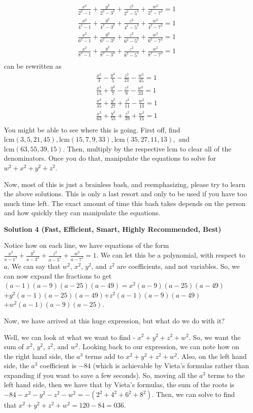 \begin{enumerate}
 
 \begin{align*} \frac{x^2}{2^2-1}+\frac{y^2}{2^2-3^2}+\frac{z^2}{2^2-5^2}+\frac{w^2}{2^2-7^2}=1\\ \frac{x^2}{4^2-1}+\frac{y^2}{4^2-3^2}+\frac{z^2}{4^2-5^2}+\frac{w^2}{4^2-7^2}=1\\ \frac{x^2}{6^2-1}+\frac{y^2}{6^2-3^2}+\frac{z^2}{6^2-5^2}+\frac{w^2}{6^2-7^2}=1\\ \frac{x^2}{8^2-1}+\frac{y^2}{8^2-3^2}+\frac{z^2}{8^2-5^2}+\frac{w^2}{8^2-7^2}=1\\ \end{align*}
can be rewritten as
 \begin{align*} \frac{x^2}{3}-\frac{y^2}{5}-\frac{z^2}{21}-\frac{w^2}{45}=1\\ \frac{x^2}{15}+\frac{y^2}{7}-\frac{z^2}{9}-\frac{w^2}{33}=1\\ \frac{x^2}{35}+\frac{y^2}{27}+\frac{z^2}{11}-\frac{w^2}{13}=1\\ \frac{x^2}{63}+\frac{y^2}{55}+\frac{z^2}{39}+\frac{w^2}{15}=1\\ \end{align*}
You might be able to see where this is going. First off, find $\text{lcm}(3,5,21,45),\text{lcm}(15,7,9,33), \text{lcm}(35,27,11,13),$ and $\text{lcm}(63,55,39,15)$. Then, multiply by the respective lcm to clear all of the denominators. Once you do that, manipulate the equations to solve for $w^2+x^2+y^2+z^2$.

 Now, most of this is just a brainless bash, and reemphasizing, please try to learn the above solutions. This is only a last resort and only to be used if you have too much time left. The exact amount of time this bash takes depends on the person and how quickly they can manipulate the equations.

 



\textbf{Solution 4 (Fast, Efficient, Smart, Highly Recommended, Best)}

Notice how on each line, we have equations of the form $\frac{x^2}{a-1^2}+\frac{y^2}{a-3^2}+\frac{z^2}{a-5^2}+\frac{w^2}{a-7^2}=1$. We can let this be a polynomial, with respect to $a$. We can say that $w^2$, $x^2$, $y^2$, and $z^2$ are coefficients, and not variables. So, we can now expand the fractions to get$(a-1)(a-9)(a-25)(a-49)=x^2(a-9)(a-25)(a-49)$$+ y^2(a-1)(a-25)(a-49)$$+ z^2(a-1)(a-9)(a-49)$$+ w^2(a-1)(a-9)(a-25)$.

 Now, we have arrived at this huge expression, but what do we do with it?

 Well, we can look at what we want to find - $x^2+y^2+z^2+w^2$. So, we want the sum of $x^2$, $y^2$, $z^2$, and $w^2$. Looking back to our expression, we can note how on the right hand side, the $a^3$ terms add to $x^2+y^2+z^2+w^2$. Also, on the left hand side, the $a^3$ coefficient is $-84$ (which is achievable by Vieta's formulas rather than expanding if you want to save a few seconds). So, moving all the $a^3$ terms to the left hand side, then we have that by Vieta's formulas, the sum of the roots is $-84-x^2-y^2-z^2-w^2=-(2^2+4^2+6^2+8^2)$. Then, we can solve to find that $x^2+y^2+z^2+w^2=120-84=\boxed{036}$.

 


\end{enumerate}